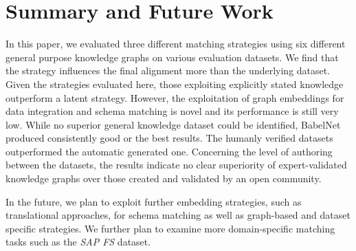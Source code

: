 \documentclass[runningheads]{llncs}
\begin{document}
\section{Summary and Future Work}
\label{sec:summary_future_work}
In this paper, we evaluated three different matching strategies using six different general purpose knowledge graphs on various evaluation datasets. 
We find that the strategy influences the final alignment more than the underlying dataset. 
Given the strategies evaluated here, those exploiting explicitly stated knowledge outperform a latent strategy. However, the exploitation of graph embeddings for data integration and schema matching is novel and its performance is still very low. 
While no superior general knowledge dataset could be identified, BabelNet produced consistently good or the best results. The humanly verified datasets outperformed the automatic generated one. Concerning the level of authoring between the datasets, the results indicate no clear superiority of expert-validated knowledge graphs over those created and validated by an open community.

In the future, we plan to exploit further embedding strategies, such as translational approaches, for schema matching as well as graph-based and dataset specific strategies. We further plan to examine more domain-specific matching tasks such as the \textit{SAP FS} dataset. 




\end{document}
